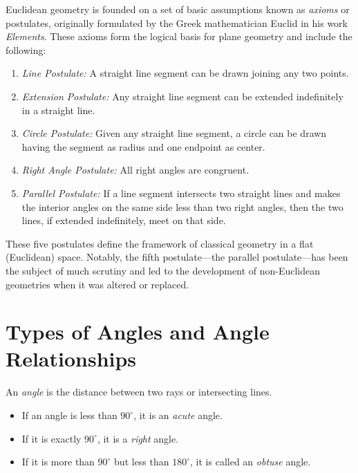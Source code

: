 Euclidean geometry is founded on a set of basic assumptions known as \emph{axioms} or postulates, originally 
formulated by the Greek mathematician Euclid in his work \textit{Elements}. These axioms form the logical 
basis for plane geometry and include the following:

\begin{enumerate}[label=\Roman*.]

	\item \emph{Line Postulate:} A straight line segment can be drawn joining any two points.
    
    \item \emph{Extension Postulate:} Any straight line segment can be extended indefinitely in a straight 
			line.
    
    \item \emph{Circle Postulate:} Given any straight line segment, a circle can be drawn having the 
		   segment as radius and one endpoint as center.
    
    \item \emph{Right Angle Postulate:} All right angles are congruent.
    
    \item \emph{Parallel Postulate:} If a line segment intersects two straight lines and makes the interior  
	      angles on the same side less than two right angles, then the two lines, if extended indefinitely, 
		  meet on that side.

\end{enumerate}

These five postulates define the framework of classical geometry in a flat (Euclidean) space. Notably, 
the fifth postulate—the parallel postulate—has been the subject of much scrutiny and led to the 
development of non-Euclidean geometries when it was altered or replaced.

\section{Types of Angles and Angle Relationships}

An \emph{angle} is the distance between two rays or intersecting lines.

\begin{itemize}

	\item If an angle is less than \(90^\circ\), it is an \emph{acute} angle.

	\item If it is exactly \(90^\circ\), it is a \emph{right} angle.

	\item If it is more than \(90^\circ\) but less than \(180^\circ\), it is called an \emph{obtuse} angle.

\end{itemize}

